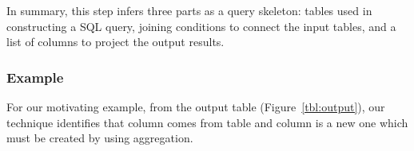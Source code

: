 \vspace{1mm}

In summary, this step infers three parts as a query skeleton: tables used in constructing a SQL query, joining conditions
to connect the input tables, and a list of columns to project the output results.





\subsubsection{Example}

For our motivating example, from the output table (Figure~\ref{tbl:output}), our technique identifies that
column {} comes from table  and
column {} is a new one which must be created by using aggregation.


